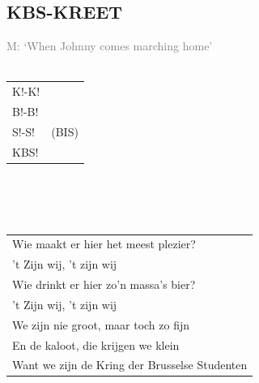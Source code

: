 \documentclass[a4paper, 14pt]{extarticle}
\begin{document}
\subsection*{KBS-KREET}
\textcolor{gray}{M: ‘When Johnny comes marching home’}
\\\\
\begin{tabularx}{0.8\textwidth}{>{\raggedright\arraybackslash}X | c}
    K!-K! &  \\
    B!-B! &  \\
    S!-S!  &  (BIS) \\
    KBS! &   \\
\end{tabularx}
\\\\\\
\begin{tabularx}{0.8\textwidth}{>{\raggedright\arraybackslash}X}
Wie maakt er hier het meest plezier? \\
’t Zijn wij, ’t zijn wij\\
Wie drinkt er hier zo’n massa’s bier?\\
’t Zijn wij, ’t zijn wij\\
We zijn nie groot, maar toch zo fijn\\
En de kaloot, die krijgen we klein\\
Want we zijn de Kring der Brusselse Studenten\\
\end{tabularx}
\end{document}

